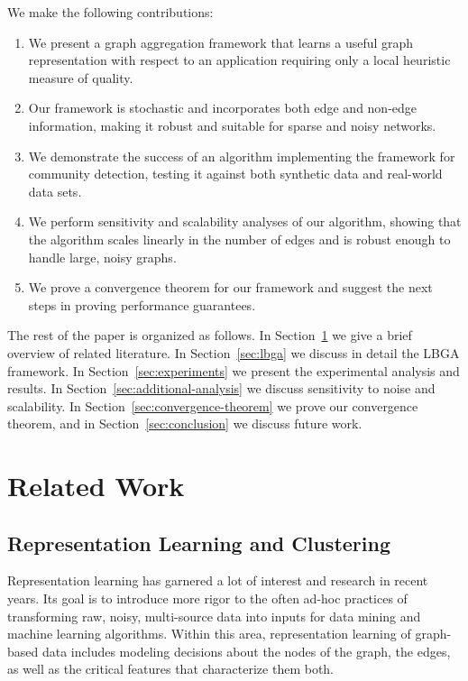 \documentclass{article}
\begin{document}
We make the following contributions:

\begin{enumerate} 
   \item We present a graph aggregation framework that learns a useful graph
representation with respect to an application requiring only a local heuristic
measure of quality.
   \item Our framework is stochastic and incorporates both edge and non-edge
information, making it robust and suitable for sparse and noisy networks.
   \item We demonstrate the success of an algorithm implementing the framework
for community detection, testing it against both synthetic data and real-world
data sets. 
   \item We perform sensitivity and scalability analyses of our algorithm,
showing that the algorithm scales linearly in the number of edges and is
robust enough to handle large, noisy graphs.  
   \item We prove a convergence theorem for our framework and suggest the next
steps in proving performance guarantees.  
\end{enumerate} 

The rest of the paper is organized as follows. In Section~\ref{sec:related} we
give a brief overview of related literature. In Section~\ref{sec:lbga} we
discuss in detail the LBGA framework. In Section~\ref{sec:experiments} we
present the experimental analysis and results. In
Section~\ref{sec:additional-analysis} we discuss sensitivity to noise and
scalability. In Section~\ref{sec:convergence-theorem} we prove our convergence
theorem, and in Section~\ref{sec:conclusion} we discuss future work.

\section{Related Work} 
\label{sec:related}
\subsection{Representation Learning and Clustering}
Representation learning has garnered a lot of interest and research in recent
years. Its goal is to introduce more rigor to the often ad-hoc practices of
transforming raw, noisy, multi-source data into inputs for data mining and
machine learning algorithms. Within this area, representation learning of
graph-based data includes modeling decisions about the nodes of the graph, the
edges, as well as the critical features that characterize them both.
\end{document}
